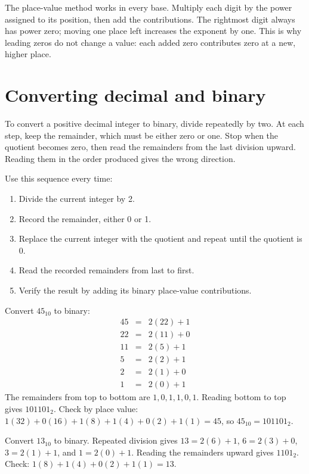 The place-value method works in every base. Multiply each digit by the
power assigned to its position, then add the contributions. The rightmost
digit always has power zero; moving one place left increases the exponent
by one. This is why leading zeros do not change a value: each added zero
contributes zero at a new, higher place.

\section{Converting decimal and binary}
To convert a positive decimal integer to binary, divide repeatedly by two.
At each step, keep the remainder, which must be either zero or one. Stop
when the quotient becomes zero, then read the remainders from the last
division upward. Reading them in the order produced gives the wrong
direction.

Use this sequence every time:
\begin{enumerate}
  \item Divide the current integer by 2.
  \item Record the remainder, either 0 or 1.
  \item Replace the current integer with the quotient and repeat until the
    quotient is 0.
  \item Read the recorded remainders from last to first.
  \item Verify the result by adding its binary place-value contributions.
\end{enumerate}

\begin{example}
Convert $45_{10}$ to binary:
\[
\begin{array}{rcl}
45&=&2(22)+1\\
22&=&2(11)+0\\
11&=&2(5)+1\\
5&=&2(2)+1\\
2&=&2(1)+0\\
1&=&2(0)+1
\end{array}
\]
The remainders from top to bottom are $1,0,1,1,0,1$. Reading bottom to top
gives $101101_2$. Check by place value:
$1(32)+0(16)+1(8)+1(4)+0(2)+1(1)=45$, so
$45_{10}=101101_2$.
\end{example}

\begin{example}
Convert $13_{10}$ to binary. Repeated division gives
$13=2(6)+1$, $6=2(3)+0$, $3=2(1)+1$, and $1=2(0)+1$. Reading the
remainders upward gives $1101_2$. Check:
$1(8)+1(4)+0(2)+1(1)=13$.
\end{example}

